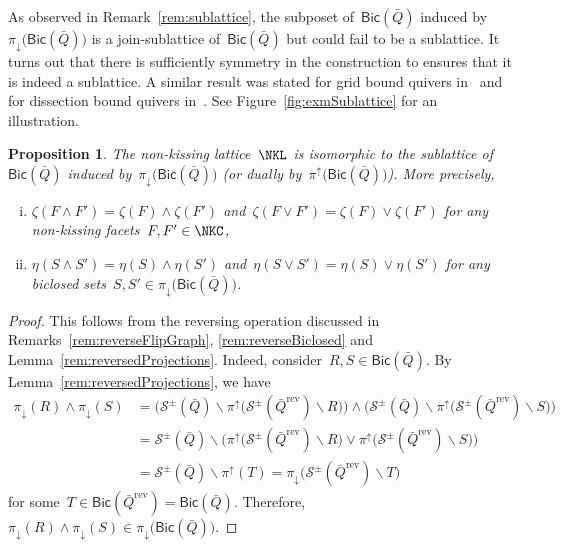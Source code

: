 \documentclass{amsart}
\newtheorem{proposition}[theorem]{Proposition}
\theoremstyle{definition}
\newcommand{\ssm}{\smallsetminus} %
\newcommand{\fref}[1]{Figure~\ref{#1}} %
\newcommand{\strings}{\mathcal{S}} %
\newcommand{\reversed}[1]{#1^{\mathrm{rev}}} %
\newcommand{\meet}{\wedge} %
\newcommand{\join}{\vee} %
\newcommand{\Bicl}[1]{\mathsf{Bic}(#1)} %
\newcommand{\projDown}{\pi_\downarrow} %
\newcommand{\projUp}{\pi^\uparrow} %
\begin{document}
As observed in Remark~\ref{rem:sublattice}, the subposet of~$\Bicl{\bar Q}$ induced by~$\projDown \big( \Bicl{\bar Q} \big)$ is a join-sublattice of~$\Bicl{\bar Q}$ but could fail to be a sublattice.
It turns out that there is sufficiently symmetry in the construction to ensures that it is indeed a sublattice.
A similar result was stated for grid bound quivers in~\cite[Lem.~4.5]{GarverMcConville-grid} and for dissection bound quivers in~\cite[Thm.~4.11]{GarverMcConville}.
See \fref{fig:exmSublattice} for an illustration.

\begin{proposition}
\label{prop:sublattice}
The non-kissing lattice~$\NKL$ is isomorphic to the sublattice of~$\Bicl{\bar Q}$ induced by~$\projDown \big( \Bicl{\bar Q} \big)$ (or dually by~$\projUp \big( \Bicl{\bar Q} \big)$). More precisely,
\begin{enumerate}[(i)]
\item $\zeta(F \meet F') = \zeta(F) \meet \zeta(F')$ and~$\zeta(F \join F') = \zeta(F) \join \zeta(F')$ for any non-kissing facets~${F, F' \in \NKC}$,
\item $\eta(S \meet S') = \eta(S) \meet \eta(S')$ and~$\eta(S \join S') = \eta(S) \join \eta(S')$ for any biclosed sets~$S, S' \in \projDown \big( \Bicl{\bar Q} \big)$.
\end{enumerate}
\end{proposition}

\begin{proof}
This follows from the reversing operation discussed in Remarks~\ref{rem:reverseFlipGraph}, \ref{rem:reverseBiclosed} and Lemma~\ref{rem:reversedProjections}.
Indeed, consider~$R, S \in \Bicl{\bar Q}$.
By Lemma~\ref{rem:reversedProjections}, we have
\begin{align*}
\projDown(R) \meet \projDown(S) 
& = \big( \strings^\pm(\bar Q) \ssm \projUp\big( \strings^\pm(\reversed{\bar Q}) \ssm R \big) \big) \meet \big( \strings^\pm(\bar Q) \ssm \projUp\big( \strings^\pm(\reversed{\bar Q}) \ssm S \big) \big) \\
& = \strings^\pm(\bar Q) \ssm \big( \projUp\big( \strings^\pm(\reversed{\bar Q}) \ssm R \big) \join \projUp\big( \strings^\pm(\reversed{\bar Q}) \ssm S \big) \big) \\
& = \strings^\pm(\bar Q) \ssm \projUp(T) = \projDown\big( \strings^\pm(\reversed{\bar Q}) \ssm T \big)
\end{align*}
for some~$T \in \Bicl{\reversed{\bar Q}} = \Bicl{\bar Q}$.
Therefore, $\projDown(R) \meet \projDown(S) \in \projDown \big( \Bicl{\bar Q} \big)$.
\end{proof}
\end{document}
